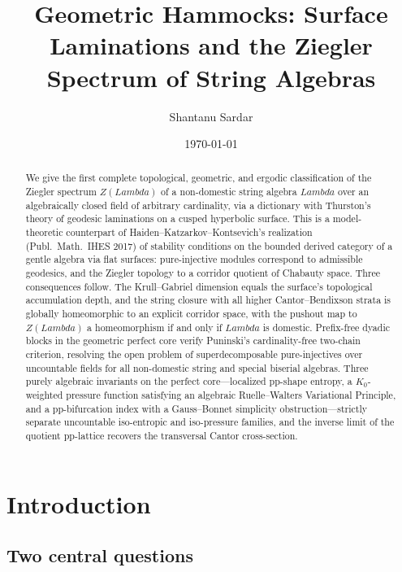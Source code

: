 \documentclass[11pt,a4paper,reqno]{amsart}
\title[Geometric Hammocks and the Ziegler Spectrum]{Geometric Hammocks: Surface Laminations and the Ziegler Spectrum of String Algebras}
\author{Shantanu Sardar}
\date{\today}
\def\operatorname#1{#1}%
\def\Zg{Z}%
\def\Lambda{Lambda}%
\def\emph#1{#1}%
\theoremstyle{definition}
\theoremstyle{remark}
\newcommand{\Zg}{\operatorname{Zg}}
\begin{document}
\begin{abstract}
We give the first complete topological, geometric, and ergodic classification of the Ziegler spectrum $\Zg(\Lambda)$ of a non-domestic string algebra $\Lambda$ over an algebraically closed field of arbitrary cardinality, via a dictionary with Thurston's theory of geodesic laminations on a cusped hyperbolic surface. This is a model-theoretic counterpart of Haiden--Katzarkov--Kontsevich's realization (\emph{Publ.\ Math.\ IHES} 2017) of stability conditions on the bounded derived category of a gentle algebra via flat surfaces: pure-injective modules correspond to admissible geodesics, and the Ziegler topology to a corridor quotient of Chabauty space. Three consequences follow. The Krull--Gabriel dimension equals the surface's topological accumulation depth, and the string closure with all higher Cantor--Bendixson strata is globally homeomorphic to an explicit corridor space, with the pushout map to $\Zg(\Lambda)$ a homeomorphism if and only if $\Lambda$ is domestic. Prefix-free dyadic blocks in the geometric perfect core verify Puninski's cardinality-free two-chain criterion, resolving the open problem of superdecomposable pure-injectives over uncountable fields for all non-domestic string and special biserial algebras. Three purely algebraic invariants on the perfect core---localized pp-shape entropy, a $K_0$-weighted pressure function satisfying an algebraic Ruelle--Walters Variational Principle, and a pp-bifurcation index with a Gauss--Bonnet simplicity obstruction---strictly separate uncountable iso-entropic and iso-pressure families, and the inverse limit of the quotient pp-lattice recovers the transversal Cantor cross-section.
\end{abstract}

\maketitle

\vspace{-0.9em}
\section{Introduction}
\label{sec:intro}

\subsection{Two central questions}
\label{subsec:two_questions}
\end{document}
